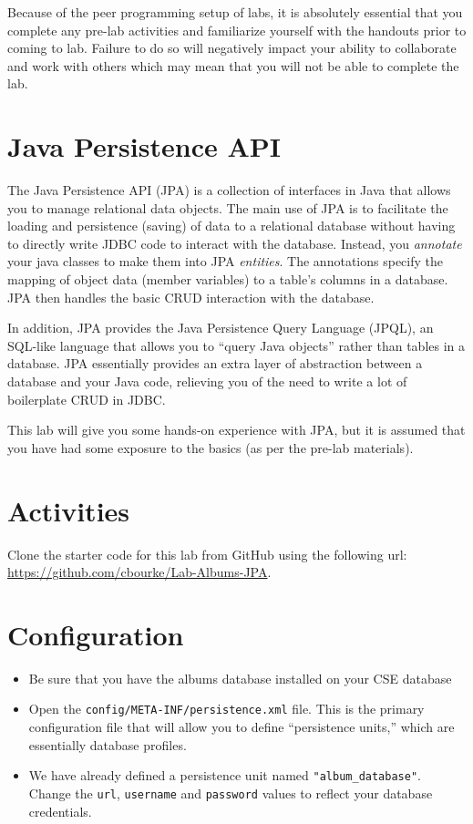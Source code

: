 \documentclass[12pt]{scrartcl}
\begin{document}
Because of the peer programming setup of labs, it is absolutely 
essential that you complete any pre-lab activities and familiarize
yourself with the handouts prior to coming to lab.  Failure to do
so will negatively impact your ability to collaborate and work with 
others which may mean that you will not be able to complete the
lab.  

\section*{Java Persistence API}

The Java Persistence API (JPA) is a collection of interfaces in Java that
allows you to manage relational data objects.  The main use of JPA is to 
facilitate the loading and persistence (saving) of data to a relational
database without having to directly write JDBC code to interact with the
database.  Instead, you \emph{annotate} your java classes to make them into
JPA \emph{entities}.  The annotations specify the mapping of object data
(member variables) to a table's columns in a database.  JPA then handles the
basic CRUD interaction with the database.  

In addition, JPA provides the Java Persistence Query Language (JPQL), an 
SQL-like language that allows you to ``query Java objects'' rather than 
tables in a database.  JPA essentially provides an extra layer of abstraction
between a database and your Java code, relieving you of the need to write a
lot of boilerplate CRUD in JDBC.

This lab will give you some hands-on experience with JPA, but it is assumed that
you have had some exposure to the basics (as per the pre-lab materials).

\section*{Activities}

Clone the starter code for this lab from GitHub using the following
url: \url{https://github.com/cbourke/Lab-Albums-JPA}.

\section*{Configuration}

\begin{itemize}
  \item Be sure that you have the albums database installed on your CSE 
    database
  \item Open the \texttt{config/META-INF/persistence.xml} file.
  	This is the primary configuration file that will allow you to define
	``persistence units,'' which are essentially database profiles.
  \item We have already defined a persistence unit named \texttt{"album_database"}.
    Change the \texttt{url}, \texttt{username} and
    \texttt{password} values to reflect your database 
    credentials.
\end{itemize}
\end{document}
